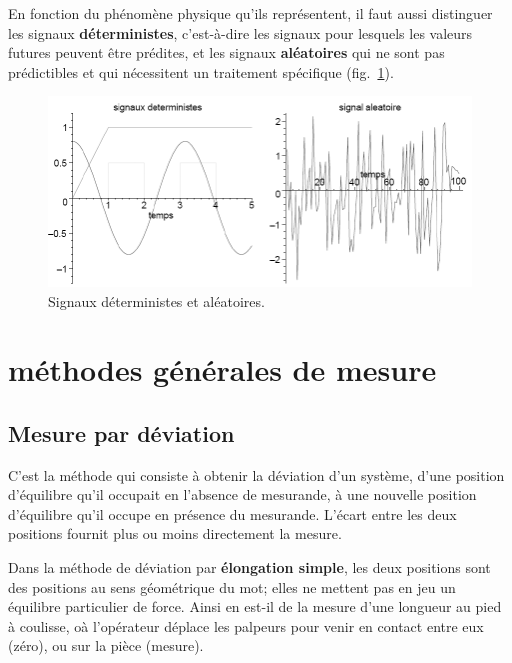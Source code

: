 \newpage
En fonction du phénomène physique qu'ils représentent, il faut aussi distinguer les signaux \textbf{déterministes}, c'est-à-dire les signaux pour lesquels les valeurs futures peuvent être prédites, et les signaux \textbf{aléatoires} qui ne sont pas prédictibles et qui nécessitent un traitement spécifique (fig.~\ref{fig:sigda}).
\begin{figure}[h]
    \centering
    \includegraphics[width=16cm]{assets/figures/sigda.pdf}
    \caption{Signaux déterministes et aléatoires.}
    \label{fig:sigda}
\end{figure}

\section{méthodes générales de mesure}

\subsection{Mesure par déviation}

C'est la méthode qui consiste à obtenir la déviation d'un système, d'une position d'équilibre qu'il occupait en l'absence de mesurande, à une nouvelle position d'équilibre qu'il occupe en présence du mesurande.  L'écart entre les deux positions fournit plus ou moins directement la mesure.

Dans la méthode de déviation par \textbf{élongation simple}, les deux positions sont des positions au sens géométrique du mot; elles ne mettent pas en jeu un équilibre particulier de force. Ainsi en est-il de la mesure d'une longueur au pied à coulisse, oà l'opérateur déplace les palpeurs pour venir en contact entre eux (zéro), ou sur la pièce (mesure).

